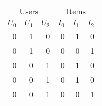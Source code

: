 \begin{tabular}{rrrrrr}
\toprule
\multicolumn{3}{c}{Users} & \multicolumn{3}{c}{Items}\\
\cmidrule{1-3} \cmidrule{4-6}
$U_0$ &  $U_1$ &  $U_2$ &  $I_0$ &  $I_1$ &  $I_2$ \\
\midrule
 0 &  \alert1 &  0 &  0 &  \alert1 &  0 \\
 0 &  \alert1 &  0 &  0 &  0 &  \alert1 \\
 0 &  0 &  \alert1 &  0 &  \alert1 &  0 \\
 0 &  0 &  \alert1 &  0 &  \alert1 &  0 \\
 0 &  0 &  \alert1 &  0 &  0 &  \alert1 \\
\bottomrule
\end{tabular}
